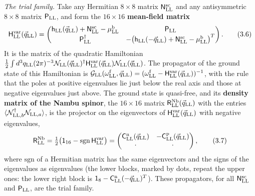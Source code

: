 \documentclass[
  10pt,
]{article}
\begin{document}
\emph{The trial family.} Take any Hermitian \(8\times8\) matrix
\(\mathsf N^{\rm sc}_{\rm LL}\) and any antisymmetric \(8\times8\)
matrix \(\mathsf P_{\rm LL}\), and form the \(16\times16\)
\textbf{mean-field matrix}
\[\mathsf H^{\rm var}_{\rm LL}(\vec q_{\rm LL})=\begin{pmatrix}\mathsf h_{\rm LL}(\vec q_{\rm LL})+\mathsf N^{\rm sc}_{\rm LL}-\mu^{\rm b}_{\rm LL}&\mathsf P_{\rm LL}\\
\mathsf P_{\rm LL}^\dagger&-\big(\mathsf h_{\rm LL}(-\vec q_{\rm LL})+\mathsf N^{\rm sc}_{\rm LL}-\mu^{\rm b}_{\rm LL}\big)^T\end{pmatrix}.\tag{3.6}\]
It is the matrix of the quadratic Hamiltonian
\(\tfrac12\int d^3q_{\rm LL}(2\pi)^{-3}\mathcal N_{\rm LL}(\vec q_{\rm LL})^\dagger\mathsf H^{\rm var}_{\rm LL}(\vec q_{\rm LL})\mathcal N_{\rm LL}(\vec q_{\rm LL})\).
The propagator of the ground state of this Hamiltonian is
\(\mathcal G_{\rm LL}(\omega^{\rm f}_{\rm LL},\vec q_{\rm LL})=(\omega^{\rm f}_{\rm LL}-\mathsf H^{\rm var}_{\rm LL}(\vec q_{\rm LL}))^{-1}\),
with the rule that the poles at positive eigenvalues lie just below the
real axis and those at negative eigenvalues just above. The ground state
is quasi-free, and its \textbf{density matrix of the Nambu spinor}, the
\(16\times16\) matrix \(\mathsf R^{\rm Nb}_{\rm LL}(\vec q_{\rm LL})\)
with the entries
\(\langle\mathcal N^\dagger_{{\rm LL},b}\mathcal N_{{\rm LL},a}\rangle\),
is the projector on the eigenvectors of
\(\mathsf H^{\rm var}_{\rm LL}(\vec q_{\rm LL})\) with negative
eigenvalues,
\[\mathsf R^{\rm Nb}_{\rm LL}=\tfrac12\big(\mathsf 1_{16}-\mathrm{sgn}\,\mathsf H^{\rm var}_{\rm LL}\big)
=\begin{pmatrix}\mathsf C^{\rm n}_{\rm LL}(\vec q_{\rm LL})&-\mathsf C^{\rm p}_{\rm LL}(\vec q_{\rm LL})\\\cdot&\cdot\end{pmatrix},\tag{3.7}\]
where \(\mathrm{sgn}\) of a Hermitian matrix has the same eigenvectors
and the signs of the eigenvalues as eigenvalues (the lower blocks,
marked by dots, repeat the upper ones: the lower right block is
\(\mathsf 1_8-\mathsf C^{\rm n}_{\rm LL}(-\vec q_{\rm LL})^T\)). These
propagators, for all \(\mathsf N^{\rm sc}_{\rm LL}\) and
\(\mathsf P_{\rm LL}\), are the trial family.
\end{document}
